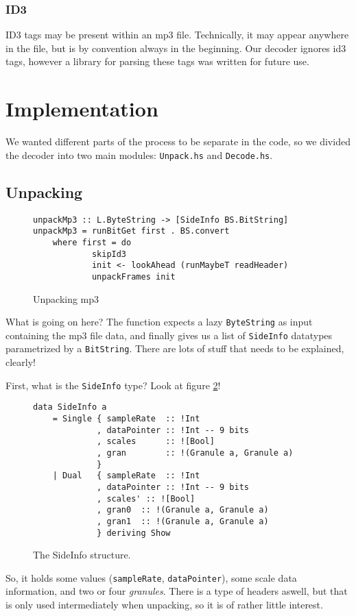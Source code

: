 \documentclass[a4paper,12pt]{article}
\begin{document}
        \subsubsection{ID3}
            ID3 tags may be present within an mp3 file. Technically, it may
            appear anywhere in the file, but is by convention always in the
            beginning. Our decoder ignores id3 tags, however a library for
            parsing these tags was written for future use.

\section{Implementation}
    We wanted different parts of the process to be separate in the code, so we
    divided the decoder into two main modules: \texttt{Unpack.hs} and
    \texttt{Decode.hs}.

    \subsection{Unpacking}
\begin{figure}[H]
  \begin{center}
    \begin{lstlisting}
unpackMp3 :: L.ByteString -> [SideInfo BS.BitString]
unpackMp3 = runBitGet first . BS.convert
    where first = do
            skipId3
            init <- lookAhead (runMaybeT readHeader)
            unpackFrames init
    \end{lstlisting}
    \caption{Unpacking mp3}\label{fig:unpacking_mp3}
  \end{center}
\end{figure}

    What is going on here? The function expects a lazy \texttt{ByteString} as
    input containing the mp3 file data, and finally gives us a list of
    \texttt{SideInfo} datatypes parametrized by a \texttt{BitString}. There are
    lots of stuff that needs to be explained, clearly!

    First, what is the \texttt{SideInfo} type? Look at
    figure \ref{fig:sideinfo_struct}!
\begin{figure}[H]
  \begin{center}
    \begin{lstlisting}
data SideInfo a
    = Single { sampleRate  :: !Int
             , dataPointer :: !Int -- 9 bits
             , scales      :: ![Bool]
             , gran        :: !(Granule a, Granule a)
             }
    | Dual   { sampleRate  :: !Int
             , dataPointer :: !Int -- 9 bits
             , scales' :: ![Bool]
             , gran0  :: !(Granule a, Granule a)
             , gran1  :: !(Granule a, Granule a)
             } deriving Show
    \end{lstlisting}
    \caption{The SideInfo structure.}\label{fig:sideinfo_struct}
  \end{center}
\end{figure}
    So, it holds some values (\texttt{sampleRate}, \texttt{dataPointer}), some
    scale data information, and two or four \textit{granules}. There is a type
    of headers aswell, but that is only used intermediately when unpacking, so
    it is of rather little interest. 
\end{document}
